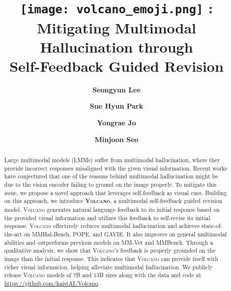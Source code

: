 \documentclass[11pt]{article}
\title{\texttt{[image: volcano\_emoji.png]} {\Ours}: Mitigating Multimodal Hallucination through \\ Self-Feedback Guided Revision}
\author[1,2\thanks{\hspace{0.15cm}Work done during internship at KAIST AI}]{\textbf{Seongyun Lee}}
\author[2]{\textbf{Sue Hyun Park}}
\author[3]{\textbf{Yongrae Jo}}
\author[2]{\textbf{Minjoon Seo}}
\affil[1]{Korea University}
\affil[2]{KAIST AI}
\affil[3]{LG AI Research \protect \\[3ex] \texttt{sy-lee@korea.ac.kr \{suehyunpark, minjoon\}@kaist.ac.kr yongrae.jo@lgresearch.ai}}
\newcommand{\Ours}{\textsc{Volcano}}
\begin{document}
\maketitle
\begin{abstract}
Large multimodal models (LMMs) suffer from multimodal hallucination, where they provide incorrect responses misaligned with the given visual information. Recent works have conjectured that one of the reasons behind multimodal hallucination might be due to the vision encoder failing to ground on the image properly. To mitigate this issue, we propose a novel approach that leverages self-feedback as visual cues. Building on this approach, we introduce \textbf{{\Ours}}, a multimodal self-feedback guided revision model. {\Ours} generates natural language feedback to its initial response based on the provided visual information and utilizes this feedback to self-revise its initial response. {\Ours} effectively reduces multimodal hallucination and achieves state-of-the-art on MMHal-Bench, POPE, and GAVIE. It also improves on general multimodal abilities and outperforms previous models on MM-Vet and MMBench. Through a qualitative analysis, we show that {\Ours}'s feedback is properly grounded on the image than the initial response. This indicates that {\Ours} can provide itself with richer visual information, helping alleviate multimodal hallucination. We publicly release {\Ours} models of 7B and 13B sizes along with the data and code at \href{https://github.com/kaistAI/Volcano}{https://github.com/kaistAI/Volcano}.
\end{abstract}
\end{document}
